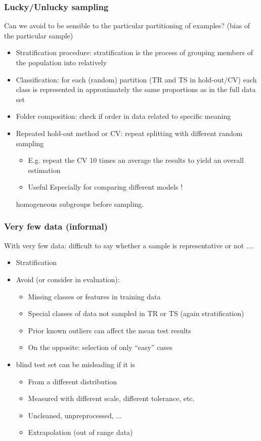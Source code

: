 \documentclass[../main.tex]{subfiles}
\begin{document}
\subsubsection{Lucky/Unlucky sampling}
Can we avoid to be sensible to the particular partitioning of examples? (bias of the particular sample)
\begin{itemize}
    \item Stratification procedure: stratification is the process of grouping members of the population into relatively
    
    \item Classification: for each (random) partition (TR and TS in hold-out/CV) each class is represented in approximately the same proportions as in the full data set
    
    \item Folder composition: check if order in data related to specific meaning
    
    \item Repeated hold-out method or CV: repeat splitting with different random sampling
    \begin{itemize}
        \item E.g. repeat the CV 10 times an average the results to yield an overall estimation
        \item Useful Especially for comparing different models !
    \end{itemize}
homogeneous subgroups before sampling.
\end{itemize}

\subsubsection{Very few data (informal)}
With very few data: difficult to say whether a sample is representative or not ....
\begin{itemize}
    \item Stratification
    \item Avoid (or consider in evaluation):
    \begin{itemize}
        \item Missing classes or features in training data
        \item Special classes of data not sampled in TR or TS (again stratification)
        \item Prior known outliers can affect the mean test results
        \item On the opposite: selection of only “easy” cases
    \end{itemize}
    \item blind test set can be misleading if it is
    \begin{itemize}
        \item From a different distribution
        \item Measured with different scale, different tolerance, etc.
        \item Uncleaned, unpreprocessed, ...
        \item Extrapolation (out of range data)
    \end{itemize}
\end{itemize}
\end{document}
